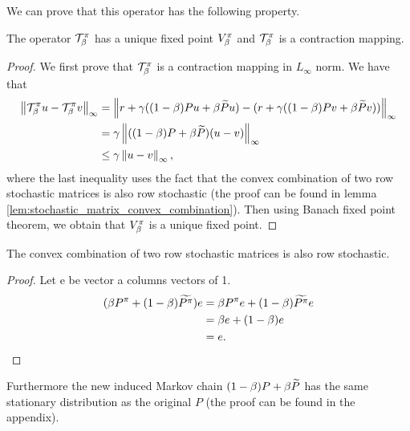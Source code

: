 We can prove that this operator has the following property.
\begin{theorem}
The operator $\mathcal{T}^{\pi}_{\beta}$ has a unique fixed point $V_{\beta}^{\pi}$ and $\mathcal{T}^{\pi}_{\beta}$ is a contraction mapping.
\end{theorem}
\begin{proof}
We first prove that $\mathcal{T}^{\pi}_{\beta}$ is a contraction mapping in $L_\infty$ norm. We have that
\begin{equation}
\begin{split}
    \left\lVert\mathcal{T}^{\pi}_{\beta} u - \mathcal{T}^{\pi}_{\beta} v\right\rVert_{\infty} &= \left\lVert r+\gamma( (1-\beta) Pu + \beta \widetilde{P}u) - (r+\gamma( (1-\beta) Pv + \beta \widetilde{P}v))\right\rVert_{\infty}\\
    &= \gamma \left\lVert((1-\beta) P + \beta \widetilde{P})(u-v)\right\rVert_{\infty}\\
    &\leq \gamma \left\lVert u-v\right\rVert_{\infty},
\end{split}
\end{equation}
where the last inequality uses the fact that the convex combination of two row stochastic matrices is also row stochastic (the proof can be found in lemma \ref{lem:stochastic_matrix_convex_combination}).
Then using Banach fixed point theorem, we obtain that $V_{\beta}^{\pi}$ is a unique fixed point. 
\end{proof}

\begin{lemma}
\label{lem:stochastic_matrix_convex_combination}
The convex combination of two row stochastic matrices is also row stochastic.
\end{lemma}
\begin{proof}
Let e be vector a columns vectors of 1.
\begin{equation}
\begin{split}
       (\beta P^{\pi} + (1-\beta) \widetilde{P^{\pi}})e &= \beta P^{\pi}e +  (1-\beta) \widetilde{P^{\pi}}e \\
       &= \beta e + (1-\beta) e\\
       &= e.
\end{split}
\end{equation}
\end{proof}
Furthermore the new induced Markov chain $(1-\beta) P + \beta \widetilde{P}$ has the same stationary distribution as the original $P$ (the proof can be found in the appendix).

